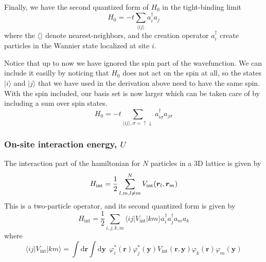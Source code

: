 \documentclass[11pt,letter]{article}
\newcommand{\bv}[1]{\ensuremath{\bm{#1}}}
\newcommand{\dbl}{\ensuremath{ \uparrow\! \downarrow \, }}
\begin{document}
Finally, we have the second quantized form of $H_{0}$ in the tight-binding
limit 
\begin{equation}
  H_{0} = -t \sum_{ \langle ij \rangle } a_{i}^{\dagger}a_{j} 
\end{equation}
where the $\langle \rangle$ denote nearest-neighbors, and the creation operator
$a_{i}^{\dagger}$ create particles in the Wannier state localized at site $i$.

Notice that up to now we have ignored the spin part of the wavefunction.   We
can include it easilly by noticing that $H_{0}$ does not act on the spin at
all, so the states $|i\rangle$ and $|j\rangle$ that we have used in the
derivation above need to have the same spin.   With the spin included, our
basis set is now larger which can be taken care of by including a sum over spin
states.   
\begin{equation}
  H_{0} = -t \sum_{ \langle ij \rangle, \sigma=\dbl   } a_{i\sigma}^{\dagger}a_{j\sigma} 
\end{equation}

\subsubsection{On-site interaction energy, $U$}

The interaction part of the hamiltonian for $N$ particles in a 3D lattice is
given by \begin{equation}
    H_{\text{int}} = 
         \frac{1}{2}\sum_{ l,m, l\neq m}^{N} 
         V_{\mathrm{int}}(\bv{r}_{l},\bv{r}_{m} )\\ 
\end{equation}
This is a two-particle operator, and its second quantized form is given by
\begin{equation}
   H_{\text{int}} = \frac{1}{2} \sum_{i,j,k,m} 
           \langle ij | V_{\mathrm{int}} | km \rangle
           a_{i}^{\dagger} a_{j}^{\dagger} a_{m} a_{k}
\end{equation}
where 
\begin{equation}
    \langle ij | V_{\mathrm{int}} | km \rangle =
    \int \mathrm{d}\bv{r} \int \mathrm{d}\bv{y} \ \  
    \varphi_{i}^{*}(\bv{r}) \varphi_{j}^{*}(\bv{y}) 
    V_{\mathrm{int}}(\bv{r},\bv{y}) 
    \varphi_{k}(\bv{r}) \varphi_{m}(\bv{y}) 
\end{equation}
\end{document}
